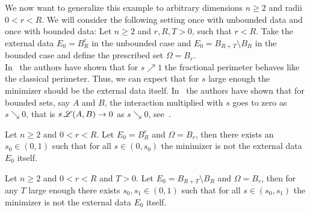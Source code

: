 We now want to generalize this example to arbitrary dimensions \( n\geq 2 \) and radii \( 0 < r < R
\). We will consider the following setting once with unbounded data and once with bounded data: Let
\( n \geq 2 \) and \( r, R, T > 0 \), such that \( r < R \). Take the external data \( E_0 = B_R^c
\) in the unbounded case and \( E_0 = B_{R + T} \setminus B_R \) in the bounded case and define the
prescribed set \( \Omega = B_r \). \\

In~\cite{Caffarelli2011} the authors have shown that for \( s \nearrow 1 \) the fractional perimeter
behaves like the classical perimeter. Thus, we can expect that for \( s \) large enough the minimizer
should be the external data itself. In~\cite{dipierro2012asymptotics} the authors have shown that
for bounded sets, say \( A \) and \( B \), the interaction multiplied with \( s \) goes to zero as
\( s \searrow 0 \), that is \( s \operatorname{\mathscr{L}}(A, B) \to 0 \) as \( s \searrow 0 \), see~\cite[Eq. (3.2)]{dipierro2012asymptotics}.

\begin{theorem}
	\label{thm:201}
	Let \( n \geq 2 \) and \( 0 < r < R \). Let \( E_0 = B_R^c \) and \( \Omega = B_r \), then there
	exists an \( s_0 \in (0, 1) \) such that for all \( s \in (0, s_0) \) the minimizer is not the
	external data \( E_0 \) itself.
\end{theorem}

\begin{theorem}
	\label{thm:202}
	Let \( n \geq 2 \) and \( 0 < r < R \) and \( T > 0 \). Let \( E_0 = B_{R + T} \setminus B_R \)
	and \( \Omega = B_r \), then for any \( T \) large enough there exists \( s_0, s_1 \in (0, 1) \)
	such that for all \( s \in (s_0, s_1) \) the minimizer is not the external data \( E_0 \) itself.
\end{theorem}

